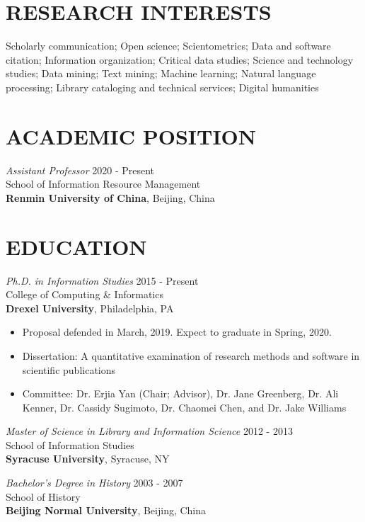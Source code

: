 \documentclass[margin, 10pt]{res} %
\begin{document}
\begin{resume}


\section{RESEARCH INTERESTS}  

Scholarly communication; Open science; Scientometrics; Data and software citation; Information organization; Critical data studies; Science and technology studies; Data mining; Text mining; Machine learning; Natural language processing; Library cataloging and technical services; Digital humanities

\section{ACADEMIC POSITION}
{\sl Assistant Professor} \hfill 2020 - Present \\
School of Information Resource Management\\
\textbf{Renmin University of China}, Beijing, China

\section{EDUCATION}

{\sl Ph.D. in Information Studies} \hfill 2015 - Present \\
College of Computing \& Informatics\\
\textbf{Drexel University}, Philadelphia, PA
\begin{itemize}
\item Proposal defended in March, 2019. Expect to graduate in Spring, 2020.
\item Dissertation: A quantitative examination of research methods and software in scientific publications
\item Committee: Dr. Erjia Yan (Chair; Advisor), Dr. Jane Greenberg, Dr. Ali Kenner, Dr. Cassidy Sugimoto, Dr. Chaomei Chen, and Dr. Jake Williams
\end{itemize} 

{\sl Master of Science in Library and Information Science} \hfill 2012 - 2013 \\
School of Information Studies\\
\textbf{Syracuse University}, Syracuse, NY
 
{\sl Bachelor’s Degree in History} \hfill 2003 - 2007\\
School of History\\
\textbf{Beijing Normal University}, Beijing, China


\end{resume}
\end{document}
